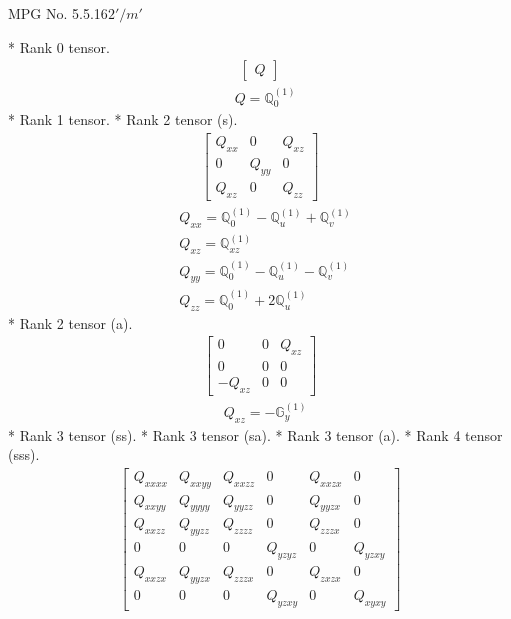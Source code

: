 \documentclass[fleqn,8pt,landscape]{jsarticle}
\begin{document}
\setcounter{MaxMatrixCols}{32}

\renewcommand{\tablename}{Table~}
\renewcommand{\figurename}{Figure~}
\begin{center}
\LARGE
MPG No. 5.5.16\quad$2'/m'$
\end{center}
* Rank 0 tensor.
\begin{align*}
\begin{bmatrix} Q \end{bmatrix}
\end{align*}
\begin{align*}
& Q = \mathbb{Q}_{0}^{(1)}
\end{align*}
* Rank 1 tensor.
* Rank 2 tensor (s).
\begin{align*}
\begin{bmatrix} Q_{xx} & 0 & Q_{xz} \\ 0 & Q_{yy} & 0 \\ Q_{xz} & 0 & Q_{zz} \end{bmatrix}
\end{align*}
\begin{align*}
& Q_{xx} = \mathbb{Q}_{0}^{(1)} - \mathbb{Q}_{u}^{(1)} + \mathbb{Q}_{v}^{(1)} \\
& Q_{xz} = \mathbb{Q}_{xz}^{(1)} \\
& Q_{yy} = \mathbb{Q}_{0}^{(1)} - \mathbb{Q}_{u}^{(1)} - \mathbb{Q}_{v}^{(1)} \\
& Q_{zz} = \mathbb{Q}_{0}^{(1)} + 2 \mathbb{Q}_{u}^{(1)}
\end{align*}
* Rank 2 tensor (a).
\begin{align*}
\begin{bmatrix} 0 & 0 & Q_{xz} \\ 0 & 0 & 0 \\ - Q_{xz} & 0 & 0 \end{bmatrix}
\end{align*}
\begin{align*}
& Q_{xz} = - \mathbb{G}_{y}^{(1)}
\end{align*}
* Rank 3 tensor (ss).
* Rank 3 tensor (sa).
* Rank 3 tensor (a).
* Rank 4 tensor (sss).
\begin{align*}
\begin{bmatrix} Q_{xxxx} & Q_{xxyy} & Q_{xxzz} & 0 & Q_{xxzx} & 0 \\ Q_{xxyy} & Q_{yyyy} & Q_{yyzz} & 0 & Q_{yyzx} & 0 \\ Q_{xxzz} & Q_{yyzz} & Q_{zzzz} & 0 & Q_{zzzx} & 0 \\ 0 & 0 & 0 & Q_{yzyz} & 0 & Q_{yzxy} \\ Q_{xxzx} & Q_{yyzx} & Q_{zzzx} & 0 & Q_{zxzx} & 0 \\ 0 & 0 & 0 & Q_{yzxy} & 0 & Q_{xyxy} \end{bmatrix}
\end{align*}
\end{document}
